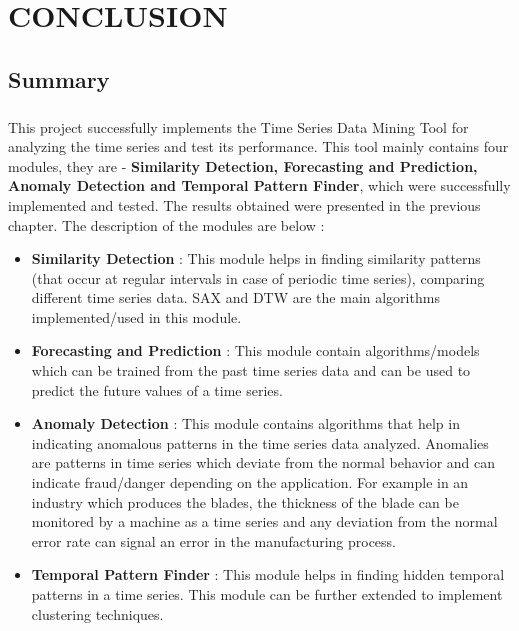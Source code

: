 \documentclass[12pt,a4paper]{report}
\begin{document}
\pagestyle{fancy}
\chead{}
\rfoot{\small{\thepage}}
\renewcommand{\headrulewidth}{0.4pt}
\renewcommand{\footrulewidth}{0.4pt}
\chapter{CONCLUSION}
\section{Summary}
\paragraph{}This project successfully implements the Time Series Data Mining Tool for analyzing the time series and test its performance. This tool mainly contains four modules, they are - \textbf{Similarity Detection, Forecasting and Prediction, Anomaly Detection and Temporal Pattern Finder}, which were successfully implemented and tested. The results obtained were presented in the previous chapter.
\noindent
The description of the modules are below :
\begin{itemize}
\item \textbf{Similarity Detection} : This module helps in finding similarity patterns (that occur at regular intervals in case of periodic time series), comparing different time series data. SAX and DTW are the main algorithms implemented/used in this module.
\item \textbf{Forecasting and Prediction} : This module contain algorithms/models which can be trained from the past time series data and can be used to predict the future values of a time series. 
\item \textbf{Anomaly Detection} : This module contains algorithms that help in indicating anomalous patterns in the time series data analyzed. Anomalies are patterns in time series which deviate from the normal behavior and can indicate fraud/danger depending on the application. For example in an industry which produces the blades, the thickness of the blade can be monitored by a machine as a time series and any deviation from the normal error rate can signal an error in the manufacturing process.
\item \textbf{Temporal Pattern Finder } : This module helps in finding hidden temporal patterns in a time series. This module can be further extended to implement clustering techniques.
\end{itemize}
\end{document}

